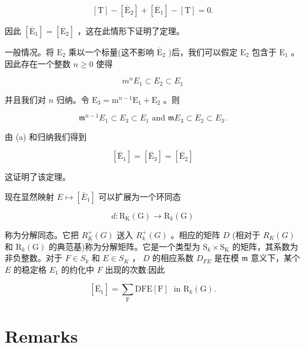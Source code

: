 \documentclass[10pt]{article}
\begin{document}
\[
\left\lbrack  \mathrm{T}\right\rbrack   - \left\lbrack  {\overline{\mathrm{E}}}_{2}\right\rbrack   + \left\lbrack  {\overline{\mathrm{E}}}_{1}\right\rbrack   - \left\lbrack  \mathrm{T}\right\rbrack   = 0.
\]

因此 \(\left\lbrack  {\overline{\mathrm{E}}}_{1}\right\rbrack   = \left\lbrack  {\overline{\mathrm{E}}}_{2}\right\rbrack\) ，这在此情形下证明了定理。

一般情况。将 \({\mathrm{E}}_{2}\) 乘以一个标量(这不影响 \({\overline{\mathrm{E}}}_{2}\) )后，我们可以假定 \({\mathrm{E}}_{2}\) 包含于 \({\mathrm{E}}_{1}\) 。因此存在一个整数 \(n \geq  0\) 使得

\[
{m}^{n}{E}_{1} \subset  {E}_{2} \subset  {E}_{1}
\]

并且我们对 \(n\) 归纳。令 \({\mathrm{E}}_{3} = {\mathrm{m}}^{n - 1}{\mathrm{E}}_{1} + {\mathrm{E}}_{2}\) 。则

\[
{\mathfrak{m}}^{n - 1}{E}_{1} \subset  {E}_{3} \subset  {E}_{1}\text{ and }\mathfrak{m}{E}_{3} \subset  {E}_{2} \subset  {E}_{3}.
\]

由 (a) 和归纳我们得到

\[
\left\lbrack  {\overline{\mathrm{E}}}_{1}\right\rbrack   = \left\lbrack  {\overline{\mathrm{E}}}_{3}\right\rbrack   = \left\lbrack  {\overline{\mathrm{E}}}_{2}\right\rbrack
\]

这证明了该定理。

现在显然映射 \(E \mapsto  \left\lbrack  {\bar{E}}_{1}\right\rbrack\) 可以扩展为一个环同态

\[
d : {\mathrm{R}}_{\mathrm{K}}\left( \mathrm{G}\right)  \rightarrow  {\mathrm{R}}_{k}\left( \mathrm{G}\right)
\]

称为分解同态。它把 \({R}_{K}^{ + }\left( G\right)\) 送入 \({R}_{k}^{ + }\left( G\right)\) 。相应的矩阵 \(D\) (相对于 \({R}_{K}\left( G\right)\) 和 \({\mathrm{R}}_{k}\left( \mathrm{G}\right)\) 的典范基)称为分解矩阵。它是一个类型为 \({\mathrm{S}}_{k} \times  {\mathrm{S}}_{\mathrm{K}}\) 的矩阵，其系数为非负整数。对于 \(F \in  {S}_{k}\) 和 \(E \in  {S}_{K}\) ， \(D\) 的相应系数 \({D}_{FE}\) 是在模 \(\mathfrak{m}\) 意义下，某个 \(E\) 的稳定格 \({E}_{1}\) 的约化中 \(F\) 出现的次数:因此

\[
\left\lbrack  {\overline{\mathrm{E}}}_{1}\right\rbrack   = \mathop{\sum }\limits_{\mathrm{F}}\mathrm{D}\mathrm{{FE}}\left\lbrack  \mathrm{F}\right\rbrack  \;\text{ in }{\mathrm{R}}_{k}\left( \mathrm{G}\right) .
\]

\section*{Remarks}
\end{document}
